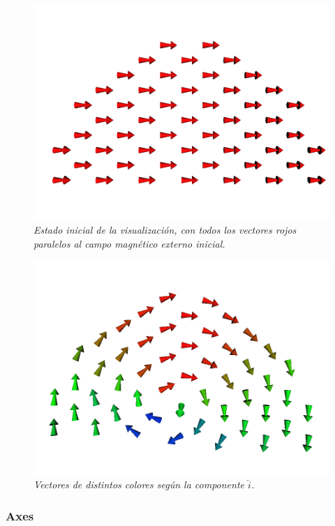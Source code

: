 \begin{figure}[ht]
  \centering
  \includegraphics[scale=.3]{images/atomCanvas-vectores-inicial}
  \caption{\em Estado inicial de la visualización, con todos los vectores rojos paralelos al campo magnético externo inicial.}
  \label{atomCanvas-vectores-inicial}
\end{figure}

\begin{figure}[ht]
  \centering
  \includegraphics[scale=.3]{images/atomCanvas-vectores-colores}
  \caption{\em Vectores de distintos colores según la componente $\hat{i}$.}
  \label{atomCanvas-vectores-colores}
\end{figure}

\subsubsection{Axes}

